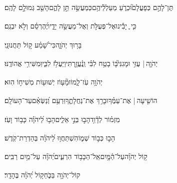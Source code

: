 \documentclass[12pt]{article}
\newcommand{\loc}[1]{\textsuperscript{\locf{#1}}}
\begin{document}
{\loc{ ד}~}‏תֶּן־לָהֶ֣ם כְּפָעֳלָם֮{\hfill}וּכְרֹ֢עַ מַעַלְלֵ֫יהֶ֥ם\newline\hspace*{.5em}כְּמַעֲשֵׂ֣ה  תֵּ֣ן לָהֶ֑ם{\hfill}הָשֵׁ֖ב גְּמוּלָ֣ם לָהֶֽם׃\par

{\loc{ ה}~}‏כִּ֤י ֪ יָבִ֡ינוּ{\hfill}אֶל־פְּעֻלֹּ֣ת \newline\hspace*{.5em}וְאֶל־מַעֲשֵׂ֣ה יָדָ֑יו{\hfill}יֶ֝הֶרְסֵ֗ם וְלֹ֣א יִבְנֵֽם׃\par

{\loc{ ו}~}‏בָּר֥וּךְ יְהֹוָ֑ה{\hfill}כִּי־שָׁ֝מַ֗ע ק֣וֹל תַּחֲנוּנָֽי׃\par

{\loc{ ז}~}‏יְהֹוָ֤ה |  עֻזִּ֥י וּמָגִנִּי֮{\hfill}בּ֤וֹ בָטַ֥ח לִבִּ֗י וְֽנֶ֫עֱזָ֥רְתִּי\newline\hspace*{.5em}וַיַּעֲלֹ֥ז לִבִּ֑י{\hfill}וּֽמִשִּׁירִ֥י אֲהוֹדֶֽנּוּ׃\par

{\loc{ ח}~}‏יְהֹוָ֥ה עֹֽז־לָ֑מוֹ{\hfill}וּמָ֘ע֤וֹז יְשׁוּע֖וֹת מְשִׁיח֣וֹ הֽוּא׃\par

{\loc{ ט}~}‏הוֹשִׁ֤יעָה |  אֶת־עַמֶּ֗ךָ{\hfill}וּבָרֵ֥ךְ אֶת־נַחֲלָתֶ֑ךָ\newline\hspace*{.5em}וּֽרְעֵ֥ם וְ֝נַשְּׂאֵ֗ם{\hfill}עַד־הָעוֹלָֽם׃\par\pend
\ledpb
\pstart[\subsection*{\textcolor{red}{פרק כט}}]\label{פרק כט}
{\loc{ א}~}‏מִזְמ֗וֹר לְדָ֫וִ֥ד\newline\hspace*{.5em}הָב֣וּ  בְּנֵ֣י אֵלִ֑ים{\hfill}הָב֥וּ לַ֝יהֹוָ֗ה כָּב֥וֹד וָעֹֽז׃\par

{\loc{ ב}~}‏הָב֣וּ  כְּב֣וֹד שְׁמ֑וֹ{\hfill}הִשְׁתַּחֲו֥וּ לַ֝יהֹוָ֗ה בְּהַדְרַת־קֹֽדֶשׁ׃\par

{\loc{ ג}~}‏ק֥וֹל יְהֹוָ֗ה{\hfill}עַל־הַ֫מָּ֥יִם\newline\hspace*{.5em}אֵֽל־הַכָּב֥וֹד הִרְעִ֑ים{\hfill}יְ֝הֹוָ֗ה עַל־מַ֥יִם רַבִּֽים׃\par

{\loc{ ד}~}‏קוֹל־יְהֹוָ֥ה בַּכֹּ֑חַ{\hfill}ק֥וֹל יְ֝הֹוָ֗ה בֶּהָדָֽר׃\par
\end{document}
